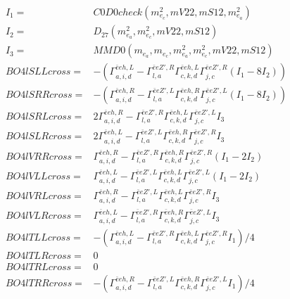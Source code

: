 \documentclass[A4,landscape]{article}
\begin{document}
\begin{align} 
I_1 = & C0D0check(m^2_{e_{{c}}}, mV22, mS12, m^2_{e_{{a}}}) \\ 
I_2 = & D_{27}(m^2_{e_{{a}}}, m^2_{e_{{c}}}, mV22, mS12) \\ 
I_3 = & MMD0(m_{e_{{a}}}, m_{e_{{c}}}, m^2_{e_{{a}}}, m^2_{e_{{c}}}, mV22, mS12) \\ 
  BO4lSLLcross= & -( \Gamma^{\bar{e}e h ,L}_{a, i, d} - \Gamma^{\bar{e}e {Z'} ,R} _{l, a} \Gamma^{\bar{e}e h ,L}_{c, k, d} \Gamma^{\bar{e}e {Z'} ,R}_{j, c} (I_1 - 8 I_2)) \\ 
  BO4lSRRcross= & -( \Gamma^{\bar{e}e h ,R}_{a, i, d} - \Gamma^{\bar{e}e {Z'} ,L} _{l, a} \Gamma^{\bar{e}e h ,R}_{c, k, d} \Gamma^{\bar{e}e {Z'} ,L}_{j, c} (I_1 - 8 I_2)) \\ 
  BO4lSRLcross= & 2  \Gamma^{\bar{e}e h ,R}_{a, i, d} - \Gamma^{\bar{e}e {Z'} ,R} _{l, a} \Gamma^{\bar{e}e h ,L}_{c, k, d} \Gamma^{\bar{e}e {Z'} ,L}_{j, c} I_3 \\ 
  BO4lSLRcross= & 2  \Gamma^{\bar{e}e h ,L}_{a, i, d} - \Gamma^{\bar{e}e {Z'} ,L} _{l, a} \Gamma^{\bar{e}e h ,R}_{c, k, d} \Gamma^{\bar{e}e {Z'} ,R}_{j, c} I_3 \\ 
  BO4lVRRcross= &  \Gamma^{\bar{e}e h ,R}_{a, i, d} - \Gamma^{\bar{e}e {Z'} ,R} _{l, a} \Gamma^{\bar{e}e h ,R}_{c, k, d} \Gamma^{\bar{e}e {Z'} ,R}_{j, c} (I_1 - 2 I_2) \\ 
  BO4lVLLcross= &  \Gamma^{\bar{e}e h ,L}_{a, i, d} - \Gamma^{\bar{e}e {Z'} ,L} _{l, a} \Gamma^{\bar{e}e h ,L}_{c, k, d} \Gamma^{\bar{e}e {Z'} ,L}_{j, c} (I_1 - 2 I_2) \\ 
  BO4lVRLcross= &  \Gamma^{\bar{e}e h ,R}_{a, i, d} - \Gamma^{\bar{e}e {Z'} ,L} _{l, a} \Gamma^{\bar{e}e h ,L}_{c, k, d} \Gamma^{\bar{e}e {Z'} ,R}_{j, c} I_3 \\ 
  BO4lVLRcross= &  \Gamma^{\bar{e}e h ,L}_{a, i, d} - \Gamma^{\bar{e}e {Z'} ,R} _{l, a} \Gamma^{\bar{e}e h ,R}_{c, k, d} \Gamma^{\bar{e}e {Z'} ,L}_{j, c} I_3 \\ 
  BO4lTLLcross= & -( \Gamma^{\bar{e}e h ,L}_{a, i, d} - \Gamma^{\bar{e}e {Z'} ,R} _{l, a} \Gamma^{\bar{e}e h ,L}_{c, k, d} \Gamma^{\bar{e}e {Z'} ,R}_{j, c} I_1)/4 \\ 
  BO4lTLRcross= & 0 \\ 
  BO4lTRLcross= & 0 \\ 
  BO4lTRRcross= & -( \Gamma^{\bar{e}e h ,R}_{a, i, d} - \Gamma^{\bar{e}e {Z'} ,L} _{l, a} \Gamma^{\bar{e}e h ,R}_{c, k, d} \Gamma^{\bar{e}e {Z'} ,L}_{j, c} I_1)/4 \\ 
\end{align} 
\end{document}
